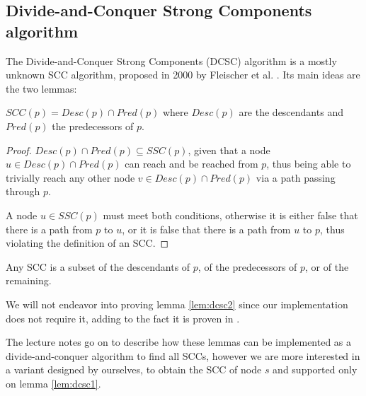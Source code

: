 \subsection{Divide-and-Conquer Strong Components algorithm}
The Divide-and-Conquer Strong Components (DCSC) algorithm is a mostly unknown SCC algorithm, proposed in 2000 by Fleischer et al. \cite{fleischer-dcsc}. Its main ideas are the two lemmas:
\begin{lemma} \label{lem:dcsc1}
    $SCC(p)=Desc(p) \cap Pred(p)$ where $Desc(p)$ are the descendants and $Pred(p)$ the predecessors of $p$.
\end{lemma}
\begin{proof}
    $Desc(p) \cap Pred(p) \subseteq SSC(p)$, given that a node $u \in Desc(p) \cap Pred(p)$ can reach and be reached from $p$, thus being able to trivially reach any other node $v \in Desc(p) \cap Pred(p)$ via a path passing through $p$.\par
    A node $u \in SSC(p)$ must meet both conditions, otherwise it is either false that there is a path from $p$ to $u$, or it is false that there is a path from $u$ to $p$, thus violating the definition of an SCC.
\end{proof}
\begin{lemma} \label{lem:dcsc2}
    Any SCC is a subset of the descendants of $p$, of the predecessors of $p$, or of the remaining.
\end{lemma}
We will not endeavor into proving lemma \ref{lem:dcsc2} since our implementation does not require it, adding to the fact it is proven in \cite{fleischer-dcsc}.\par
The lecture notes go on to describe how these lemmas can be implemented as a divide-and-conquer algorithm to find all SCCs, however we are more interested in a variant designed by ourselves, to obtain the SCC of node $s$ and supported only on lemma \ref{lem:dcsc1}.
